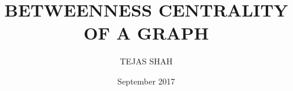 \documentclass[MTech]{iitmdiss}
\def\thesistitle{BETWEENNESS CENTRALITY OF A GRAPH}
\def\thesisauthor{TEJAS SHAH}
\begin{document}


\title{\thesistitle}
\author{\thesisauthor}

\date{September 2017}

\begin{singlespace}
\maketitle 
\end{singlespace} 






\begin{singlespace}
\tableofcontents
\thispagestyle{empty}
\listoftables
{}
\listoffigures
{}
\end{singlespace}









%
\nocite{*}
\pagebreak
\begin{singlespace}
  \begin{small}
	
  \end{small}
\end{singlespace}

\end{document}

